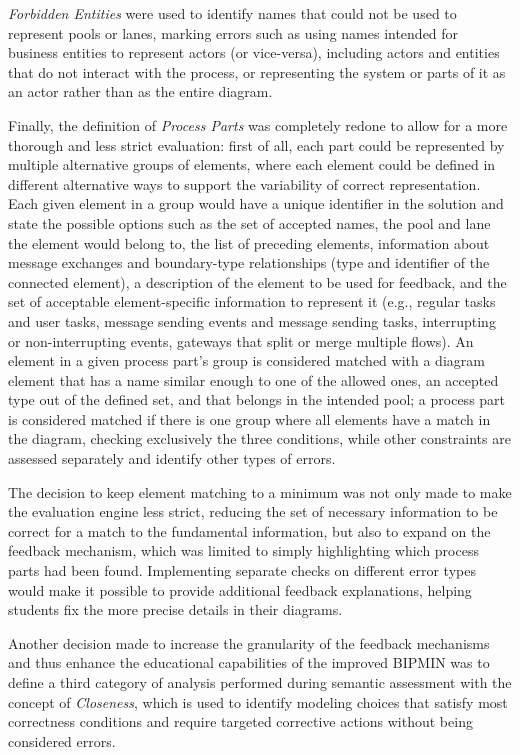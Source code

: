 \textit{Forbidden Entities} were used to identify names that could not be used to represent pools or lanes, marking errors such as using names intended for business entities to represent actors (or vice-versa), including actors and entities that do not interact with the process, or representing the system or parts of it as an actor rather than as the entire diagram.

Finally, the definition of \textit{Process Parts} was completely redone to allow for a more thorough and less strict evaluation: first of all, each part could be represented by multiple alternative groups of elements, where each element could be defined in different alternative ways to support the variability of correct representation. Each given element in a group would have a unique identifier in the solution and state the possible options such as the set of accepted names, the pool and lane the element would belong to, the list of preceding elements, information about message exchanges and boundary-type relationships (type and identifier of the connected element), a description of the element to be used for feedback, and the set of acceptable element-specific information to represent it (e.g., regular tasks and user tasks, message sending events and message sending tasks, interrupting or non-interrupting events, gateways that split or merge multiple flows). An element in a given process part's group is considered matched with a diagram element that has a name similar enough to one of the allowed ones, an accepted type out of the defined set, and that belongs in the intended pool; a process part is considered matched if there is one group where all elements have a match in the diagram, checking exclusively the three conditions, while other constraints are assessed separately and identify other types of errors. 

The decision to keep element matching to a minimum was not only made to make the evaluation engine less strict, reducing the set of necessary information to be correct for a match to the fundamental information, but also to expand on the feedback mechanism, which was limited to simply highlighting which process parts had been found. Implementing separate checks on different error types would make it possible to provide additional feedback explanations, helping students fix the more precise details in their diagrams. 

Another decision made to increase the granularity of the feedback mechanisms and thus enhance the educational capabilities of the improved BIPMIN was to define a third category of analysis performed during semantic assessment with the concept of \textit{Closeness}, which is used to identify modeling choices that satisfy most correctness conditions and require targeted corrective actions without being considered errors.

